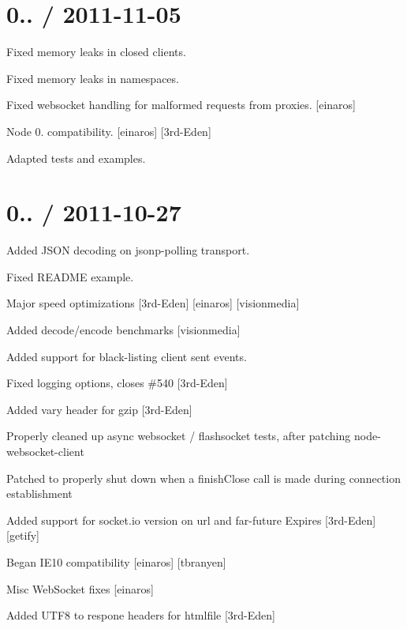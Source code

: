 \section*{0.. / 2011-\/11-\/05 }


\begin{DoxyItemize}
\item Fixed memory leaks in closed clients.
\item Fixed memory leaks in namespaces.
\item Fixed websocket handling for malformed requests from proxies. \mbox{[}einaros\mbox{]}
\item Node 0. compatibility. \mbox{[}einaros\mbox{]} \mbox{[}3rd-\/\+Eden\mbox{]}
\item Adapted tests and examples.
\end{DoxyItemize}

\section*{0.. / 2011-\/10-\/27 }


\begin{DoxyItemize}
\item Added J\+S\+ON decoding on jsonp-\/polling transport.
\item Fixed R\+E\+A\+D\+ME example.
\item Major speed optimizations \mbox{[}3rd-\/\+Eden\mbox{]} \mbox{[}einaros\mbox{]} \mbox{[}visionmedia\mbox{]}
\item Added decode/encode benchmarks \mbox{[}visionmedia\mbox{]}
\item Added support for black-\/listing client sent events.
\item Fixed logging options, closes \#540 \mbox{[}3rd-\/\+Eden\mbox{]}
\item Added vary header for gzip \mbox{[}3rd-\/\+Eden\mbox{]}
\item Properly cleaned up async websocket / flashsocket tests, after patching node-\/websocket-\/client
\item Patched to properly shut down when a finish\+Close call is made during connection establishment
\item Added support for socket.\+io version on url and far-\/future Expires \mbox{[}3rd-\/\+Eden\mbox{]} \mbox{[}getify\mbox{]}
\item Began I\+E10 compatibility \mbox{[}einaros\mbox{]} \mbox{[}tbranyen\mbox{]}
\item Misc Web\+Socket fixes \mbox{[}einaros\mbox{]}
\item Added U\+T\+F8 to respone headers for htmlfile \mbox{[}3rd-\/\+Eden\mbox{]}
\end{DoxyItemize}

